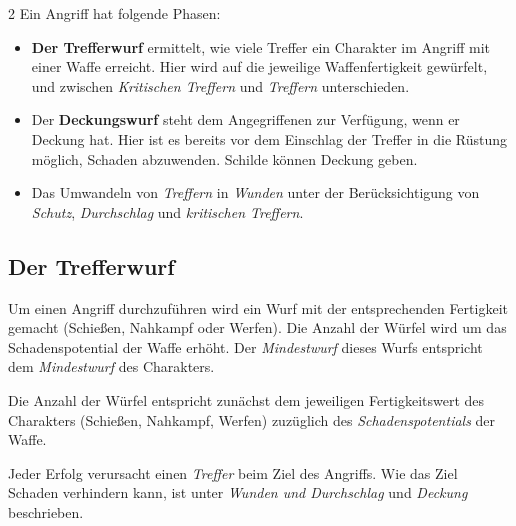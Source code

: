\begin{multicols}{2}
Ein Angriff hat folgende Phasen:
\begin{itemize}
    \item \textbf{Der Trefferwurf} ermittelt, wie viele Treffer ein Charakter im Angriff mit einer Waffe erreicht. Hier wird auf die jeweilige Waffenfertigkeit gewürfelt, und zwischen \textit{Kritischen Treffern} und \textit{Treffern} unterschieden.
    \item Der \textbf{Deckungswurf} steht dem Angegriffenen zur Verfügung, wenn er Deckung hat. Hier ist es bereits vor dem Einschlag der Treffer in die Rüstung möglich, Schaden abzuwenden. Schilde können Deckung geben.
    \item Das Umwandeln von \textit{Treffern} in \textit{Wunden} unter der Berücksichtigung von \textit{Schutz}, \textit{Durchschlag} und \textit{kritischen Treffern}.
\end{itemize}

\subsection{Der Trefferwurf}

Um einen Angriff durchzuführen wird ein Wurf mit der entsprechenden Fertigkeit gemacht (Schießen, Nahkampf oder Werfen). Die Anzahl der Würfel wird um das Schadenspotential der Waffe erhöht. Der \textit{Mindestwurf} dieses Wurfs entspricht dem \textit{Mindestwurf} des Charakters.


Die Anzahl der Würfel entspricht zunächst dem jeweiligen Fertigkeitswert des Charakters (Schießen, Nahkampf, Werfen) zuzüglich des \textit{Schadenspotentials} der Waffe.


Jeder Erfolg verursacht einen \textit{Treffer} beim Ziel des Angriffs. Wie das Ziel Schaden verhindern kann, ist unter \textit{Wunden und Durchschlag} und \textit{Deckung} beschrieben.

\end{multicols}

